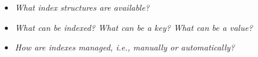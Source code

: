 
\begin{itemize}
\item \emph{What index structures are available?}
\item \emph{What can be indexed? What can be a key? What can be a value?}
\item \emph{How are indexes managed, i.e., manually or automatically?}
\end{itemize}